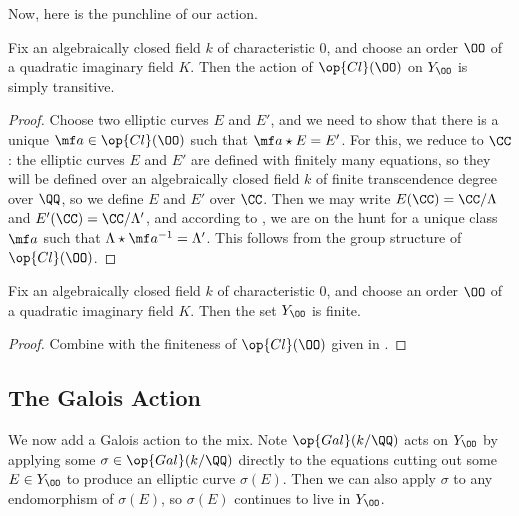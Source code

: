 \documentclass[../notes.tex]{subfiles}
\begin{document}
Now, here is the punchline of our action.
\begin{proposition} \label{prop:simply-transitive-cl-action}
	Fix an algebraically closed field $k$ of characteristic $0$, and choose an order $\OO$ of a quad\-ratic imaginary field $K$. Then the action of $\op{Cl}(\OO)$ on $Y_\OO$ is simply transitive.
\end{proposition}
\begin{proof}
	Choose two elliptic curves $E$ and $E'$, and we need to show that there is a unique $\mf a\in\op{Cl}(\OO)$ such that $\mf a\star E=E'$. For this, we reduce to $\CC$: the elliptic curves $E$ and $E'$ are defined with finitely many equations, so they will be defined over an algebraically closed field $k$ of finite transcendence degree over $\QQ$, so we define $E$ and $E'$ over $\CC$. Then we may write $E(\CC)=\CC/\Lambda$ and $E'(\CC)=\CC/\Lambda'$, and according to , we are on the hunt for a unique class $\mf a$ such that $\Lambda\star\mf a^{-1}=\Lambda'$. This follows from the group structure of $\op{Cl}(\OO)$.
\end{proof}
\begin{corollary} \label{cor:finitely-many-cm}
	Fix an algebraically closed field $k$ of characteristic $0$, and choose an order $\OO$ of a quad\-ratic imaginary field $K$. Then the set $Y_\OO$ is finite. 
\end{corollary}
\begin{proof}
	Combine  with the finiteness of $\op{Cl}(\OO)$ given in .
\end{proof}

\subsection{The Galois Action}
We now add a Galois action to the mix. Note $\op{Gal}(k/\QQ)$ acts on $Y_\OO$ by applying some $\sigma\in\op{Gal}(k/\QQ)$ directly to the equations cutting out some $E\in Y_\OO$ to produce an elliptic curve $\sigma(E)$. Then we can also apply $\sigma$ to any endomorphism of $\sigma(E)$, so $\sigma(E)$ continues to live in $Y_\OO$.
\end{document}
